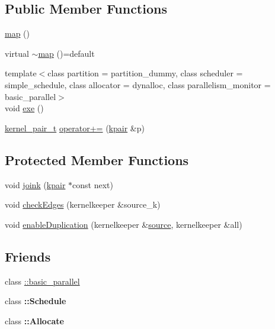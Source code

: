 \subsection*{Public Member Functions}
\begin{DoxyCompactItemize}
\item 
\hyperlink{classraft_1_1map_a058ea3b55858b74bf837cda1058d14fe}{map} ()
\item 
virtual \hyperlink{classraft_1_1map_a9a8bdcfb92f7891f9f5fd981eb1227b6}{$\sim$map} ()=default
\item 
{\footnotesize template$<$class partition  = partition\+\_\+dummy, class scheduler  = simple\+\_\+schedule, class allocator  = dynalloc, class parallelism\+\_\+monitor  = basic\+\_\+parallel$>$ }\\void \hyperlink{classraft_1_1map_a120b4bf6d1dcb186032e972878dd513d}{exe} ()
\item 
\hyperlink{classkernel__pair__t}{kernel\+\_\+pair\+\_\+t} \hyperlink{classraft_1_1map_ad4bd4cf9bdb1d49e481e572cfdb90476}{operator+=} (\hyperlink{classkpair}{kpair} \&p)
\end{DoxyCompactItemize}
\subsection*{Protected Member Functions}
\begin{DoxyCompactItemize}
\item 
void \hyperlink{classraft_1_1map_a6d65605c4d3db559332155101ff69e1b}{joink} (\hyperlink{classkpair}{kpair} $\ast$const next)
\item 
void \hyperlink{classraft_1_1map_aad8ce35fdb536b14db16b3462157dcd7}{check\+Edges} (kernelkeeper \&source\+\_\+k)
\item 
void \hyperlink{classraft_1_1map_a9eb65e50373f006fb193c203f8cab7d8}{enable\+Duplication} (kernelkeeper \&\hyperlink{classsource}{source}, kernelkeeper \&all)
\end{DoxyCompactItemize}
\subsection*{Friends}
\begin{DoxyCompactItemize}
\item 
class \hyperlink{classraft_1_1map_ae75d52e84ecfc11bcaa43dd9fe149a2f}{\+::basic\+\_\+parallel}
\item 
\hypertarget{classraft_1_1map_a59b0d31ff28240338a2b6e682030ca3c}{}\label{classraft_1_1map_a59b0d31ff28240338a2b6e682030ca3c} 
class {\bfseries \+::\+Schedule}
\item 
\hypertarget{classraft_1_1map_a7a76af3f5b64c7a5a034d5399712c4a3}{}\label{classraft_1_1map_a7a76af3f5b64c7a5a034d5399712c4a3} 
class {\bfseries \+::\+Allocate}
\end{DoxyCompactItemize}
